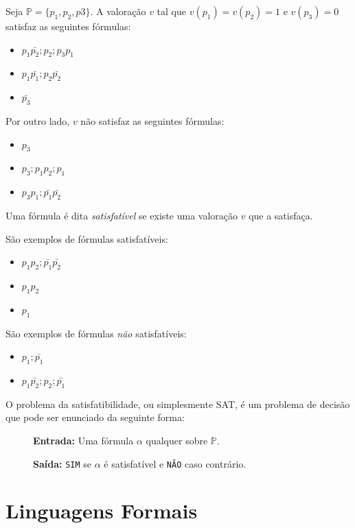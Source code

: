 \begin{example}
Seja $\mathbb{P} = \{p_1, p_2, p3\}$. A valoração $v$ tal que $v(p_1) = v(p_2) = 1$ e $v(p_3) = 0$ satisfaz as seguintes fórmulas:

\begin{itemize}
\item[] $p_1\bar{p_2};p_2;p_3p_1$
\item[] $p_1\bar{p_1};p_2\bar{p_2}$
\item[] $\bar{p_3}$ 
\end{itemize}

Por outro lado, $v$ não satisfaz as seguintes fórmulas:
\begin{itemize}
\item[] $p_3$
\item[] $p_3;p_1p_2;p_1$
\item[] $p_3p_1;\bar{p_1}\bar{p_2}$ 
\end{itemize}
\end{example}

Uma fórmula é dita {\em satisfatível} se existe uma valoração $v$ que a satisfaça.


\begin{example}
  São exemplos de fórmulas satisfatíveis:
\begin{itemize}
\item[] $p_1p_2;\bar{p_1}\bar{p_2}$
\item[] $p_1p_2$
\item[] $p_1$  
\end{itemize}

São exemplos de fórmulas {\em não} satisfatíveis:
\begin{itemize}
\item[] $p_1;\bar{p_1}$
\item[] $p_1\bar{p_2};p_2;\bar{p_1}$
\end{itemize}
\end{example}


O problema da satisfatibilidade, ou simplesmente SAT, é um problema de decisão que pode ser enunciado da seguinte forma:

  \begin{description}
  \item[] {\bf Entrada:} Uma fórmula $\alpha$ qualquer sobre $\mathbb{P}$.
  \item[] {\bf Saída:} {\tt SIM} se $\alpha$ é satisfatível e {\tt NÃO} caso contrário.
  \end{description}
  
\section{Linguagens Formais}
\label{sec:linguagens}

